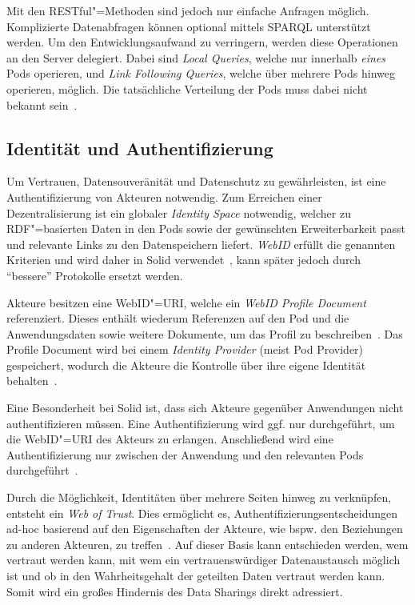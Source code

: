 Mit den RESTful"=Methoden sind jedoch nur einfache Anfragen möglich.
Komplizierte Datenabfragen können optional mittels SPARQL unterstützt werden.
Um den Entwicklungsaufwand zu verringern, werden diese Operationen an den Server delegiert.
Dabei sind \emph{Local Queries}, welche nur innerhalb \emph{eines} Pods operieren, und \emph{Link Following Queries}, welche über mehrere Pods hinweg operieren, möglich.
Die tatsächliche Verteilung der Pods muss dabei nicht bekannt sein~\cite{sambraSolidPlatformDecentralized2016}.


\subsection{Identität und Authentifizierung}

Um Vertrauen, Datensouveränität und Datenschutz zu gewährleisten, ist eine Authentifizierung von Akteuren notwendig.
Zum Erreichen einer Dezentralisierung ist ein globaler \emph{Identity Space} notwendig, welcher zu RDF"=basierten Daten in den Pods sowie der gewünschten Erweiterbarkeit passt und relevante Links zu den Datenspeichern liefert.
\emph{WebID} erfüllt die genannten Kriterien und wird daher in Solid verwendet~\cite{sambraSolidPlatformDecentralized2016}, kann später jedoch durch \enquote{bessere} Protokolle ersetzt werden.

Akteure besitzen eine WebID"=URI, welche ein \emph{WebID Profile Document} referenziert.
Dieses enthält wiederum Referenzen auf den Pod und die Anwendungsdaten sowie weitere Dokumente, um das Profil zu beschreiben~\cite{solidcommunitygroupSolidWebIDProfile2024}.
Das Profile Document wird bei einem \emph{Identity Provider} (meist Pod Provider) gespeichert, wodurch die Akteure die Kontrolle über ihre eigene Identität behalten~\cite{sambraSolidPlatformDecentralized2016}.

Eine Besonderheit bei Solid ist, dass sich Akteure gegenüber Anwendungen nicht authentifizieren müssen.
Eine Authentifizierung wird ggf. nur durchgeführt, um die WebID"=URI des Akteurs zu erlangen.
Anschließend wird eine Authentifizierung nur zwischen der Anwendung und den relevanten Pods durchgeführt~\cite{sambraSolidPlatformDecentralized2016}.

Durch die Möglichkeit, Identitäten über mehrere Seiten hinweg zu verknüpfen, entsteht ein \emph{Web of Trust}.
Dies ermöglicht es, Authentifizierungsentscheidungen ad-hoc basierend auf den Eigenschaften der Akteure, wie bspw. den Beziehungen zu anderen Akteuren, zu treffen~\cite{sambraSolidPlatformDecentralized2016}.
Auf dieser Basis kann entschieden werden, wem vertraut werden kann, mit wem ein vertrauenswürdiger Datenaustausch möglich ist und ob in den Wahrheitsgehalt der geteilten Daten vertraut werden kann.
Somit wird ein großes Hindernis des Data Sharings direkt adressiert.


